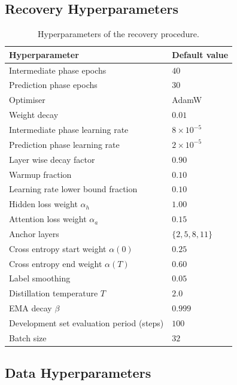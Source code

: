 \subsection{Recovery Hyperparameters}

\begin{table}[h]
\centering
\caption{Hyperparameters of the recovery procedure.}
\begin{tabular}{ll}
\toprule
Hyperparameter & Default value \\
\midrule
Intermediate phase epochs                      & $40$ \\
Prediction phase epochs                        & $30$ \\
Optimiser                                      & AdamW \\
Weight decay                                   & $0.01$ \\
Intermediate phase learning rate               & $8 \times 10^{-5}$ \\
Prediction phase learning rate                 & $2 \times 10^{-5}$ \\
Layer wise decay factor                        & $0.90$ \\
Warmup fraction                                & $0.10$ \\
Learning rate lower bound fraction             & $0.10$ \\
Hidden loss weight $\alpha_h$                  & $1.00$ \\
Attention loss weight $\alpha_a$               & $0.15$ \\
Anchor layers                                  & $\{2, 5, 8, 11\}$ \\
Cross entropy start weight $\alpha(0)$         & $0.25$ \\
Cross entropy end weight $\alpha(T)$           & $0.60$ \\
Label smoothing                                & $0.05$ \\
Distillation temperature $T$                   & $2.0$ \\
EMA decay $\beta$                              & $0.999$ \\
Development set evaluation period (steps)      & $100$ \\
Batch size                                     & $32$ \\
\bottomrule
\end{tabular}
\end{table}

\subsection{Data Hyperparameters}

